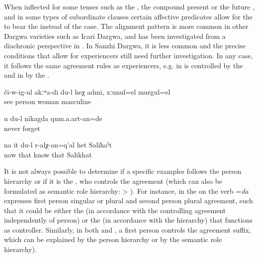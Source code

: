 When inflected for some tenses such as the , the compound present  or the future ,  and in some types of subordinate clauses certain affective predicates allow for the  to bear the  instead of the  case. The  alignment pattern is more common in other Dargwa varieties such as Icari Dargwa, and has been investigated from a diachronic perspective in \citet{Ganenkov2013}. In Sanzhi Dargwa, it is less common and the precise conditions that allow for  experiencers still need further investigation. In any case, it follows the same agreement rules as  experiencers, e.g. in   is controlled by the   and in  by the  . 
%
\begin{exe}
	\ex	\label{ex:I do not see this person, whether it is female or male}
	\gll	či-w-ig-ul	akːʷa-di	du-l	heχ	admi,	xːunul=el	murgul=el\\
		see				person		woman\tsc{=indq}		masculine\\
	\glt	{}
	
			\ex	\label{ex:‎‎I will never forget you}
	\gll	u	du-l	nikagda	qum.a.art-an=de\\
				never	forget\\
	\glt	{}
	
	\ex	\label{ex:I know her, this Salihat}
	\gll	na	it	du-l	r-alχ-an=q'al	het	Saliħaˁt\\
		now	that		know	that	Salikhat\\
	\glt	{}

\end{exe}



It is not always possible to determine if a specific examples follows the person hierarchy or if it is the , who controls the agreement (which can also be formulated as semantic role hierarchy:  > ). For instance, in  the   on the verb =\textit{da} expresses first person singular or plural and second person plural agreement, such that it could be either the  (in accordance with the  controlling agreement independently of person) or the  (in accordance with the hierarchy) that functions as controller. Similarly, in both  and , a first person  controls the agreement suffix, which can be explained by the person hierarchy or by the semantic role hierarchy). 


